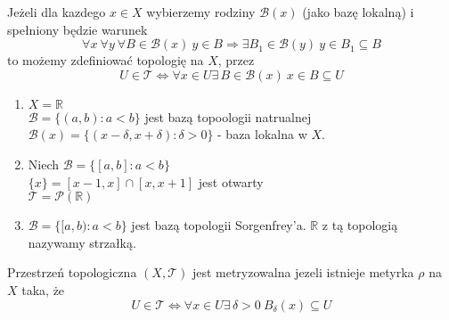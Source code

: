 \begin{tw} 
    Jeżeli dla kazdego $x \in X$  wybierzemy rodziny $\mathcal B(x)$ (jako bazę lokalną)
    i spełniony będzie warunek 
    \[ \forall x \ \forall y \ \forall B \in \mathcal B(x) \ y \in B \Rightarrow 
    \exists B_1 \in \mathcal B(y) \ y \in B_1 \subseteq B \]
    to możemy zdefiniować topologię na $X$, przez 
    \[ U \in \mathcal T \Leftrightarrow \forall x \in U \exists \, B \in \mathcal B(x) \ x \in B \subseteq U \]
\end{tw} 
\begin{przy} \hfill
    \begin{enumerate}[(1)]
        \item $X = \mathbb R$ \\ 
            $\mathcal B = \{ (a,b): a < b \}$ jest bazą topoologii natrualnej \\ 
            $\mathcal B(x) = \{(x-\delta,x+\delta): \delta > 0 \}$ - baza lokalna w $X$.
        \item Niech $\mathcal B = \{[a,b]: a < b \}$ \\ 
            $\{ x\} = [x-1,x]\cap[x,x+1]$ jest otwarty \\ 
            $\mathcal T = \mathcal P (\mathbb R)$
        \item $\mathcal B = \{[a,b): a < b\}$ jest bazą topologii Sorgenfrey'a. $\mathbb R$ z tą 
            topologią nazywamy strzałką.
    \end{enumerate} 
\end{przy} 
\begin{df} 
    Przestrzeń topologiczna $(X,\mathcal T)$ jest metryzowalna jezeli istnieje metyrka $\rho$ na $X$ taka, że
    \[ U \in \mathcal T \Leftrightarrow \forall x \in U \exists \, \delta > 0 \ B_\delta (x) \subseteq U \]
\end{df} 
